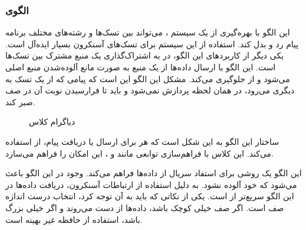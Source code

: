 \subsubsection{الگوی }
\label{scheduleQueuingSec}
\begin{RTL}
این الگو \cite{ref1} با بهره‌گیری
از یک سیستم ، می‌تواند بین تسک‌ها و رشته‌های
مختلف برنامه پیام رد و بدل کند. استفاده از این سیستم برای تسک‌های آسنکرون
بسیار ایده‌آل است. یکی دیگر از کاربردهای این الگو، در به اشتراک‌گذاری یک
منبع مشترک بین تسک‌ها است. این الگو با ارسال داده‌ها از یک منبع به صورت
 مانع آلوده‌شدن منبع اصلی می‌شود و از 
جلوگیری می‌کند. مشکل این الگو این است که پیامی که از یک تسک به دیگری
می‌رود، در همان لحظه پردازش نمی‌شود و باید تا فرارسیدن نوبت آن در صف
صبر کند.
\end{RTL}
\begin{figure}[h!]
\centering
{}
\caption{دیاگرام کلاس }
\label{ConQueuingClassDiag}
\end{figure}
\begin{RTL}
ساختار این الگو به این شکل است که هر  برای ارسال یا دریافت
پیام، از  استفاده می‌کند. این کلاس با فراهم‌سازی
توابعی مانند  و ، این امکان را فراهم می‌سازد.
\end{RTL}
\begin{RTL}
این الگو یک روشی برای استفاد سریال از داده‌ها فراهم می‌کند.
وجود  در این الگو باعث می‌شود که خود 
آلوده نشود. به دلیل استفاده از ارتباطات آسنکرون، دریافت داده‌ها در این الگو
سریع‌تر از  است.
یکی از نکاتی که باید به آن توجه کرد، انتخاب درست اندازه صف است. اگر صف خیلی
کوچک باشد، داده‌ها از دست می‌روند و اگر خیلی بزرگ باشد، استفاده از حافظه
غیر بهینه است.
\end{RTL}